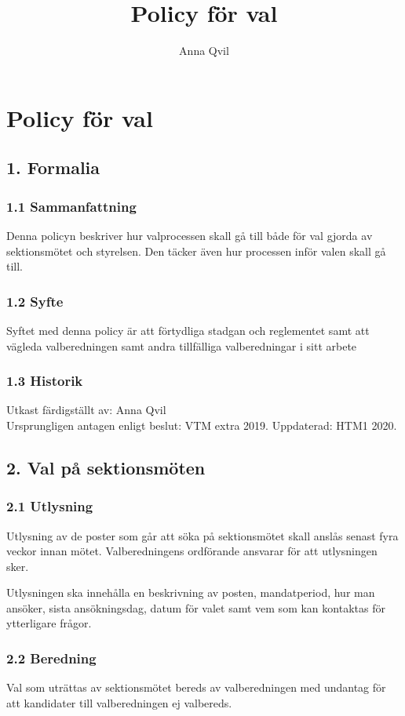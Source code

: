 \documentclass{dsekkallelse}
\title{Policy för val}
\author{Anna Qvil}
\begin{document}
\section{Policy för val}

\subsection{1. Formalia}

\subsubsection{1.1 Sammanfattning}
Denna policyn beskriver hur valprocessen skall gå till både för val gjorda av sektionsmötet och styrelsen. Den täcker även hur processen inför valen skall gå till. 

\subsubsection{1.2 Syfte}
Syftet med denna policy är att förtydliga stadgan och reglementet samt att vägleda valberedningen samt andra tillfälliga valberedningar i sitt arbete

\subsubsection{1.3 Historik}
Utkast färdigställt av: Anna Qvil \\
Ursprungligen antagen enligt beslut: VTM extra 2019.
Uppdaterad: HTM1 2020. 

\subsection{2. Val på sektionsmöten}

\subsubsection{2.1 Utlysning}
Utlysning av de poster som går att söka på sektionsmötet skall anslås senast fyra veckor innan mötet. Valberedningens ordförande ansvarar för att utlysningen sker. 

Utlysningen ska innehålla en beskrivning av posten, mandatperiod, hur man ansöker, sista  ansökningsdag, datum för valet samt vem som kan kontaktas för ytterligare frågor. 

\subsubsection{2.2 Beredning}
Val som uträttas av sektionsmötet bereds av valberedningen med undantag för att kandidater till valberedningen ej valbereds. 
\end{document}

